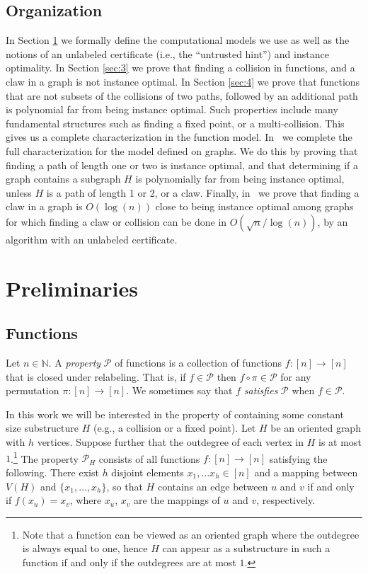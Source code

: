 \documentclass[11pt]{article}
\numberwithin{equation}{section}
\newcommand{\N}{\mathbb N}
\renewcommand{\P}{\mathcal{P}}
\newcommand{\1}{\mathbf{1}}
\begin{document}
\subsection{Organization}
In Section \ref{sec:prelims} we formally define the computational models we use as well as the notions of an unlabeled certificate (i.e., the ``untrusted hint'') and instance optimality. In Section \ref{sec:3} we prove that finding a collision in functions, and a claw in a graph is not instance optimal. In Section \ref{sec:4} we prove that functions that are not subsets of the collisions of two paths, followed by an additional path is polynomial far from being instance optimal. Such properties include many fundamental structures such as finding a fixed point, or a multi-collision. This gives us a complete characterization in the function model. In~ we complete the full characterization for the model defined on graphs. We do this by proving that finding a path of length one or two is instance optimal, and that determining if a graph contains a subgraph $H$ is polynomially far from being instance optimal, unless $H$ is a path of length 1 or 2, or a claw. Finally, in~ we prove that finding a claw in a graph is $O(\log(n))$ close to being instance optimal among graphs for which finding a claw or collision can be done in $O(\sqrt{n} /\log(n))$, by an algorithm with an unlabeled certificate. 
\section{Preliminaries}
\label{sec:prelims}

\subsection{Functions}\label{sec:prelimsfunc}




Let $n \in \N$.
A \emph{property} $\P$ of functions is a collection of functions $f \colon [n] \to [n]$ that is closed under relabeling. That is, if $f \in \P$ then $f \circ \pi \in \P$ for any permutation $\pi \colon [n] \to [n]$. 
We sometimes say that $f$ \emph{satisfies} $\P$ when $f \in \P$.

In this work we will be interested in the property of containing some constant size substructure $H$ (e.g., a collision or a fixed point). Let $H$ be an oriented graph with $h$ vertices. Suppose further that the outdegree of each vertex in $H$ is at most $1$.\footnote{Note that a function can be viewed as an oriented graph where the outdegree is always equal to one, hence $H$ can appear as a substructure in such a function if and only if the outdegrees are at most $1$.} The property $\mathcal{P}_H$ consists of all functions $f \colon [n] \to [n]$ satisfying the following. There exist $h$ disjoint elements $x_1, \ldots x_h \in [n]$ and a mapping between $V(H)$ and $\{x_1, \ldots, x_h\}$, so that $H$ contains an edge between $u$ and $v$ if and only if $f(x_u) = x_v$, where $x_u$, $x_v$ are the mappings of $u$ and $v$, respectively.
\end{document}
